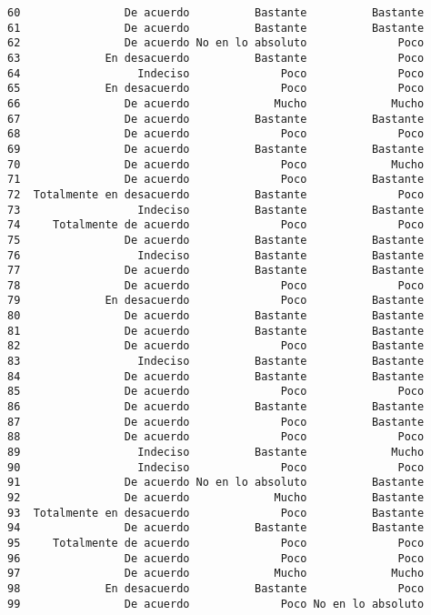 \documentclass[
  letterpaper,
  DIV=11,
  numbers=noendperiod]{scrartcl}
\begin{document}
\begin{verbatim}
60                De acuerdo          Bastante          Bastante
61                De acuerdo          Bastante          Bastante
62                De acuerdo No en lo absoluto              Poco
63             En desacuerdo          Bastante              Poco
64                  Indeciso              Poco              Poco
65             En desacuerdo              Poco              Poco
66                De acuerdo             Mucho             Mucho
67                De acuerdo          Bastante          Bastante
68                De acuerdo              Poco              Poco
69                De acuerdo          Bastante          Bastante
70                De acuerdo              Poco             Mucho
71                De acuerdo              Poco          Bastante
72  Totalmente en desacuerdo          Bastante              Poco
73                  Indeciso          Bastante          Bastante
74     Totalmente de acuerdo              Poco              Poco
75                De acuerdo          Bastante          Bastante
76                  Indeciso          Bastante          Bastante
77                De acuerdo          Bastante          Bastante
78                De acuerdo              Poco              Poco
79             En desacuerdo              Poco          Bastante
80                De acuerdo          Bastante          Bastante
81                De acuerdo          Bastante          Bastante
82                De acuerdo              Poco          Bastante
83                  Indeciso          Bastante          Bastante
84                De acuerdo          Bastante          Bastante
85                De acuerdo              Poco              Poco
86                De acuerdo          Bastante          Bastante
87                De acuerdo              Poco          Bastante
88                De acuerdo              Poco              Poco
89                  Indeciso          Bastante             Mucho
90                  Indeciso              Poco              Poco
91                De acuerdo No en lo absoluto          Bastante
92                De acuerdo             Mucho          Bastante
93  Totalmente en desacuerdo              Poco          Bastante
94                De acuerdo          Bastante          Bastante
95     Totalmente de acuerdo              Poco              Poco
96                De acuerdo              Poco              Poco
97                De acuerdo             Mucho             Mucho
98             En desacuerdo          Bastante              Poco
99                De acuerdo              Poco No en lo absoluto

\end{verbatim}
\end{document}
